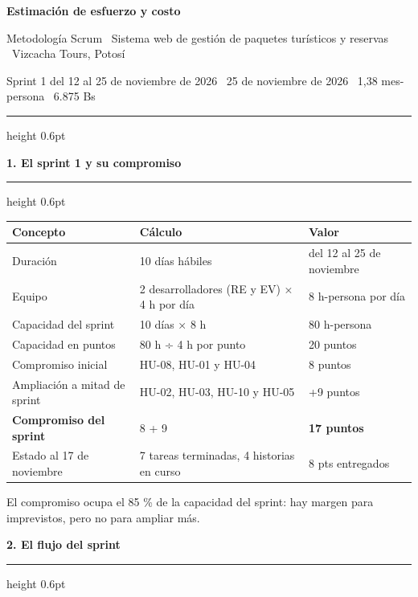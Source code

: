 \documentclass[10pt,letterpaper]{article}
\newcommand{\seccion}[1]{%
  \par\vspace{6pt}%
  {\color{azul}\bfseries\large #1}\par
  \vspace{1pt}%
  {\color{linea}\hrule height 0.6pt}\vspace{3pt}%
}
\begin{document}
{\color{azul}\bfseries\LARGE Estimación de esfuerzo y costo}\par
\vspace{1pt}
{\large Metodología Scrum \textperiodcentered\ Sistema web de gestión de paquetes
turísticos y reservas \textperiodcentered\ Vizcacha Tours, Potosí}\par
\vspace{2pt}
{\small\color{gris} Sprint 1 del 12 al 25 de noviembre de 2026 \textperiodcentered\
25 de noviembre de 2026 \textperiodcentered\ 1,38 mes-persona \textperiodcentered\
6.875 Bs}\par
\vspace{2pt}
{\color{linea}\hrule height 0.6pt}\vspace{3pt}

\seccion{1. El sprint 1 y su compromiso}

{\small
\begin{tabular}{@{}L{0.36\textwidth}L{0.30\textwidth}L{0.28\textwidth}@{}}
\toprule
\rowcolor{azul!8}
{\color{azul}\bfseries Concepto} & {\color{azul}\bfseries Cálculo} &
{\color{azul}\bfseries Valor} \\
\midrule
Duración & 10 días hábiles & del 12 al 25 de noviembre \\
Equipo & 2 desarrolladores (RE y EV) × 4 h por día & 8 h-persona por día \\
Capacidad del sprint & 10 días × 8 h & 80 h-persona \\
Capacidad en puntos & 80 h ÷ 4 h por punto & 20 puntos \\
Compromiso inicial & HU-08, HU-01 y HU-04 & 8 puntos \\
Ampliación a mitad de sprint & HU-02, HU-03, HU-10 y HU-05 & +9 puntos \\
\textbf{Compromiso del sprint} & 8 + 9 & \textbf{17 puntos} \\
Estado al 17 de noviembre & 7 tareas terminadas, 4 historias en curso & 8 pts entregados \\
\bottomrule
\end{tabular}}

\vspace{2pt}
{\small\color{gris} El compromiso ocupa el 85 \% de la capacidad del sprint: hay
margen para imprevistos, pero no para ampliar más.}

\seccion{2. El flujo del sprint}
\end{document}
